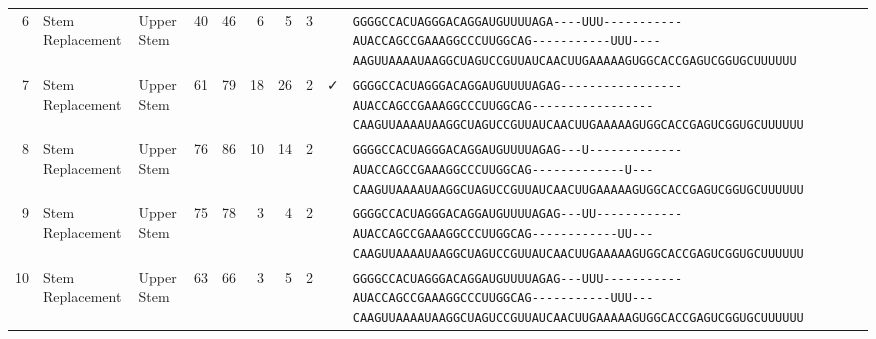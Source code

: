 \begin{tabular}{rllrrrrrcl}
 6 & Stem Replacement & Upper Stem & 40 & 46 & 6 & 5 & 3 &  &
 \color{ucsfdarkgrey}\verb|GGGGCCACUAGGGACAGGAU|\color{ucsforange}\verb|GUUUUA|\color{ucsfblue}\verb|GA----UUU-----------|\color{ucsfpurple}\verb|AUACCAGCCGAAAGGCCCUUGGCAG|\color{ucsfblue}\verb|-----------UUU----AAGU|\color{ucsforange}\verb|UAAAAUAA|\color{ucsfnavy}\verb|GGCUAGUCC|\color{ucsforange}\verb|GUUAUCA|\color{ucsfteal}\verb|ACUUGAAAAAGU|\color{ucsforange}\verb|GGCACCGAGUCGGUGCUUUUUU| \\

 7 & Stem Replacement & Upper Stem & 61 & 79 & 18 & 26 & 2 & ✓ &
 \color{ucsfdarkgrey}\verb|GGGGCCACUAGGGACAGGAU|\color{ucsforange}\verb|GUUUUA|\color{ucsfblue}\verb|GAG-----------------|\color{ucsfpurple}\verb|AUACCAGCCGAAAGGCCCUUGGCAG|\color{ucsfblue}\verb|-----------------CAAGU|\color{ucsforange}\verb|UAAAAUAA|\color{ucsfnavy}\verb|GGCUAGUCC|\color{ucsforange}\verb|GUUAUCA|\color{ucsfteal}\verb|ACUUGAAAAAGU|\color{ucsforange}\verb|GGCACCGAGUCGGUGCUUUUUU| \\

 8 & Stem Replacement & Upper Stem & 76 & 86 & 10 & 14 & 2 &  &
 \color{ucsfdarkgrey}\verb|GGGGCCACUAGGGACAGGAU|\color{ucsforange}\verb|GUUUUA|\color{ucsfblue}\verb|GAG---U-------------|\color{ucsfpurple}\verb|AUACCAGCCGAAAGGCCCUUGGCAG|\color{ucsfblue}\verb|-------------U---CAAGU|\color{ucsforange}\verb|UAAAAUAA|\color{ucsfnavy}\verb|GGCUAGUCC|\color{ucsforange}\verb|GUUAUCA|\color{ucsfteal}\verb|ACUUGAAAAAGU|\color{ucsforange}\verb|GGCACCGAGUCGGUGCUUUUUU| \\

 9 & Stem Replacement & Upper Stem & 75 & 78 & 3 & 4 & 2 &  &
 \color{ucsfdarkgrey}\verb|GGGGCCACUAGGGACAGGAU|\color{ucsforange}\verb|GUUUUA|\color{ucsfblue}\verb|GAG---UU------------|\color{ucsfpurple}\verb|AUACCAGCCGAAAGGCCCUUGGCAG|\color{ucsfblue}\verb|------------UU---CAAGU|\color{ucsforange}\verb|UAAAAUAA|\color{ucsfnavy}\verb|GGCUAGUCC|\color{ucsforange}\verb|GUUAUCA|\color{ucsfteal}\verb|ACUUGAAAAAGU|\color{ucsforange}\verb|GGCACCGAGUCGGUGCUUUUUU| \\

 10 & Stem Replacement & Upper Stem & 63 & 66 & 3 & 5 & 2 &  &
 \color{ucsfdarkgrey}\verb|GGGGCCACUAGGGACAGGAU|\color{ucsforange}\verb|GUUUUA|\color{ucsfblue}\verb|GAG---UUU-----------|\color{ucsfpurple}\verb|AUACCAGCCGAAAGGCCCUUGGCAG|\color{ucsfblue}\verb|-----------UUU---CAAGU|\color{ucsforange}\verb|UAAAAUAA|\color{ucsfnavy}\verb|GGCUAGUCC|\color{ucsforange}\verb|GUUAUCA|\color{ucsfteal}\verb|ACUUGAAAAAGU|\color{ucsforange}\verb|GGCACCGAGUCGGUGCUUUUUU| \\


\end{tabular}
